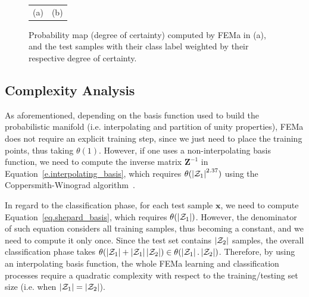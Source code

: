 \begin{figure}[!htb]
\begin{tabular}{cc}
 (a) & (b)
 \end{tabular} 
 \caption{Probability map (degree of certainty) computed by FEMa in (a), and the test samples with their class label weighted by their respective degree of certainty.}
   \label{fig.2Dcertain}
\end{figure}

\subsection{Complexity Analysis}
\label{ss.complexity}

As aforementioned, depending on the basis function used to build the probabilistic manifold (i.e. interpolating and partition of unity properties), FEMa does not require an explicit training step, since we just need to place the training points, thus taking $\theta(1)$. However, if one uses a non-interpolating basis function, we need to compute the inverse matrix $\textbf{Z}^{-1}$ in Equation~\ref{e.interpolating_basis}, which requires $\theta(\left|{\cal Z}_1\right|^{2.37})$ using the Coppersmith-Winograd algorithm~\cite{Coppersmith:90}.

In regard to the classification phase, for each test sample $\textbf{x}$, we need to compute Equation~\ref{eq.shepard_basis}, which requires $\theta({\left|{\cal Z}_1\right|})$. However, the denominator of such equation considers all training samples, thus becoming a constant, and we need to compute it only once. Since the test set contains $\left|{\cal Z}_2\right|$ samples, the overall classification phase takes $\theta(\left|{\cal Z}_1\right|+\left|{\cal Z}_1\right|\left|{\cal Z}_2\right|)\in\theta(\left|{\cal Z}_1\right|.\left|{\cal Z}_2\right|)$. Therefore, by using an interpolating basis function, the whole FEMa learning and classification processes require a quadratic complexity with respect to the training/testing set size (i.e. when $\left|{\cal Z}_1\right|=\left|{\cal Z}_2\right|$).

